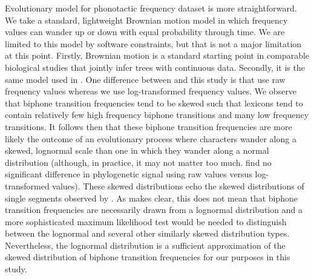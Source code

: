 Evolutionary model for phonotactic frequency dataset is more straightforward. We take a standard, lightweight Brownian motion model in which frequency values can wander up or down with equal probability through time. We are limited to this model by software constraints, but that is not a major limitation at this point. Firstly, Brownian motion is a standard starting point in comparable biological studies that jointly infer trees with continuous data. Secondly, it is the same model used in \textcite{macklin-cordes_phylogenetic_2020}. One difference between \textcite{macklin-cordes_phylogenetic_2020} and this study is that \textcite{macklin-cordes_phylogenetic_2020} use raw frequency values whereas we use log-transformed frequency values. We observe that biphone transition frequencies tend to be skewed such that lexicons tend to contain relatively few high frequency biphone transitions and many low frequency transitions. It follows then that these biphone transition frequencies are more likely the outcome of an evolutionary process where characters wander along a skewed, lognormal scale than one in which they wander along a normal distribution (although, in practice, it may not matter too much. \textcite{macklin-cordes_phylogenetic_2020} find no significant difference in phylogenetic signal using raw values versus log-transformed values). These skewed distributions echo the skewed distributions of single segments observed by \textcite{macklin-cordes_re-evaluating_2020}. As \textcite{macklin-cordes_re-evaluating_2020} makes clear, this does not mean that biphone transition frequencies are necessarily drawn from a lognormal distribution and a more sophisticated maximum likelihood test would be needed to distinguish between the lognormal and several other similarly skewed distribution types. Nevertheless, the lognormal distribution is a sufficient approximation of the skewed distribution of biphone transition frequencies for our purposes in this study.

